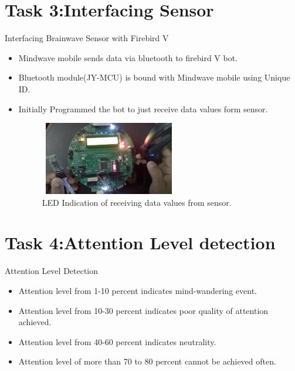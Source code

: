 \documentclass[10pt, a4paper]{beamer}
\begin{document}
\section{Task 3:Interfacing Sensor}
\begin{frame}{Interfacing Brainwave Sensor with Firebird V}
	\begin{itemize}
		\item Mindwave mobile sends data via bluetooth to firebird V bot.
		\item Bluetooth module(JY-MCU) is bound with Mindwave mobile using Unique ID.
		\item Initially Programmed the bot to just receive data values form sensor.  
	\begin{figure}[h]
		\caption{LED Indication of receiving data values from sensor.}
		\graphicspath{ {images/} }
		\includegraphics[width=6cm, height=3.2cm]{interfacing}
		\centering
	\end{figure}
\end{itemize}
\end{frame}

\section{Task 4:Attention Level detection}
\begin{frame}{Attention Level Detection}
	\begin{itemize}
		\item Attention level from 1-10 percent indicates mind-wandering event.
		\item Attention level from 10-30 percent indicates poor quality of attention achieved.
		\item Attention level from 40-60 percent indicates neutrality.
		\item Attention level of more than 70 to 80 percent cannot be achieved often.
		
	\end{itemize}
\end{frame}
\end{document}
